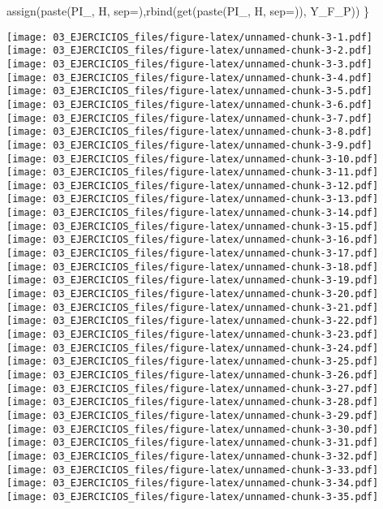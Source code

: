 \documentclass[
]{book}
\newenvironment{Shaded}{\begin{snugshade}}{\end{snugshade}}
\newcommand{\AttributeTok}[1]{\textcolor[rgb]{0.77,0.63,0.00}{#1}}
\newcommand{\FunctionTok}[1]{\textcolor[rgb]{0.00,0.00,0.00}{#1}}
\newcommand{\NormalTok}[1]{#1}
\newcommand{\StringTok}[1]{\textcolor[rgb]{0.31,0.60,0.02}{#1}}
\begin{document}
\begin{Shaded}
\begin{Highlighting}[]
\FunctionTok{assign}\NormalTok{(}\FunctionTok{paste}\NormalTok{(}\StringTok{\textquotesingle{}PI\_\textquotesingle{}}\NormalTok{, H, }\AttributeTok{sep=}\StringTok{\textquotesingle{}\textquotesingle{}}\NormalTok{),}\FunctionTok{rbind}\NormalTok{(}\FunctionTok{get}\NormalTok{(}\FunctionTok{paste}\NormalTok{(}\StringTok{\textquotesingle{}PI\_\textquotesingle{}}\NormalTok{, H, }\AttributeTok{sep=}\StringTok{\textquotesingle{}\textquotesingle{}}\NormalTok{)), }
\NormalTok{Y\_F\_P))}
\NormalTok{\}}
\end{Highlighting}
\end{Shaded}

\texttt{[image: 03\_EJERCICIOS\_files/figure-latex/unnamed-chunk-3-1.pdf]} \texttt{[image: 03\_EJERCICIOS\_files/figure-latex/unnamed-chunk-3-2.pdf]} \texttt{[image: 03\_EJERCICIOS\_files/figure-latex/unnamed-chunk-3-3.pdf]} \texttt{[image: 03\_EJERCICIOS\_files/figure-latex/unnamed-chunk-3-4.pdf]} \texttt{[image: 03\_EJERCICIOS\_files/figure-latex/unnamed-chunk-3-5.pdf]} \texttt{[image: 03\_EJERCICIOS\_files/figure-latex/unnamed-chunk-3-6.pdf]} \texttt{[image: 03\_EJERCICIOS\_files/figure-latex/unnamed-chunk-3-7.pdf]} \texttt{[image: 03\_EJERCICIOS\_files/figure-latex/unnamed-chunk-3-8.pdf]} \texttt{[image: 03\_EJERCICIOS\_files/figure-latex/unnamed-chunk-3-9.pdf]} \texttt{[image: 03\_EJERCICIOS\_files/figure-latex/unnamed-chunk-3-10.pdf]} \texttt{[image: 03\_EJERCICIOS\_files/figure-latex/unnamed-chunk-3-11.pdf]} \texttt{[image: 03\_EJERCICIOS\_files/figure-latex/unnamed-chunk-3-12.pdf]} \texttt{[image: 03\_EJERCICIOS\_files/figure-latex/unnamed-chunk-3-13.pdf]} \texttt{[image: 03\_EJERCICIOS\_files/figure-latex/unnamed-chunk-3-14.pdf]} \texttt{[image: 03\_EJERCICIOS\_files/figure-latex/unnamed-chunk-3-15.pdf]} \texttt{[image: 03\_EJERCICIOS\_files/figure-latex/unnamed-chunk-3-16.pdf]} \texttt{[image: 03\_EJERCICIOS\_files/figure-latex/unnamed-chunk-3-17.pdf]} \texttt{[image: 03\_EJERCICIOS\_files/figure-latex/unnamed-chunk-3-18.pdf]} \texttt{[image: 03\_EJERCICIOS\_files/figure-latex/unnamed-chunk-3-19.pdf]} \texttt{[image: 03\_EJERCICIOS\_files/figure-latex/unnamed-chunk-3-20.pdf]} \texttt{[image: 03\_EJERCICIOS\_files/figure-latex/unnamed-chunk-3-21.pdf]} \texttt{[image: 03\_EJERCICIOS\_files/figure-latex/unnamed-chunk-3-22.pdf]} \texttt{[image: 03\_EJERCICIOS\_files/figure-latex/unnamed-chunk-3-23.pdf]} \texttt{[image: 03\_EJERCICIOS\_files/figure-latex/unnamed-chunk-3-24.pdf]} \texttt{[image: 03\_EJERCICIOS\_files/figure-latex/unnamed-chunk-3-25.pdf]} \texttt{[image: 03\_EJERCICIOS\_files/figure-latex/unnamed-chunk-3-26.pdf]} \texttt{[image: 03\_EJERCICIOS\_files/figure-latex/unnamed-chunk-3-27.pdf]} \texttt{[image: 03\_EJERCICIOS\_files/figure-latex/unnamed-chunk-3-28.pdf]} \texttt{[image: 03\_EJERCICIOS\_files/figure-latex/unnamed-chunk-3-29.pdf]} \texttt{[image: 03\_EJERCICIOS\_files/figure-latex/unnamed-chunk-3-30.pdf]} \texttt{[image: 03\_EJERCICIOS\_files/figure-latex/unnamed-chunk-3-31.pdf]} \texttt{[image: 03\_EJERCICIOS\_files/figure-latex/unnamed-chunk-3-32.pdf]} \texttt{[image: 03\_EJERCICIOS\_files/figure-latex/unnamed-chunk-3-33.pdf]} \texttt{[image: 03\_EJERCICIOS\_files/figure-latex/unnamed-chunk-3-34.pdf]} \texttt{[image: 03\_EJERCICIOS\_files/figure-latex/unnamed-chunk-3-35.pdf]} 
\end{document}
